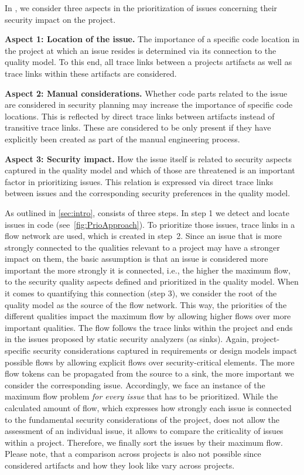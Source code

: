 	    In \appr{}, we consider three aspects in the prioritization of issues concerning their security impact on the project.
	    \begin{description}
	        \item \textbf{Aspect 1: Location of the issue.} The importance of a specific code location in the project at which an issue resides is determined via its connection to the quality model. To this end, all trace links between a projects artifacts as well as trace links within these artifacts are considered.
	        \item \textbf{Aspect 2: Manual considerations.} Whether code parts related to the issue are considered in security planning may increase the importance of specific code locations. This is reflected by direct trace links between artifacts instead of transitive trace links. These are considered to be only present if they have explicitly been created as part of the manual engineering process.
	        \item \textbf{Aspect 3: Security impact.} How the issue itself is related to security aspects captured in the quality model and which of those are threatened is an important factor in prioritizing issues. This relation is expressed via direct trace links between issues and the corresponding security preferences in the quality model.
	    \end{description}

As outlined in \autoref{sec:intro}, \appr{} consists of three steps.
In step 1 we detect and locate issues in code (see~\autoref{fig:PrioApproach}).
To prioritize those issues, trace links in a flow network are used, which is created in step~2.
Since an issue that is more strongly connected to the qualities relevant to a project may have a stronger impact on them, the basic assumption is that an issue is considered more important the more strongly it is connected, i.e., the higher the maximum flow, to the security quality aspects defined and prioritized in the quality model.
When it comes to quantifying this connection (step 3), we consider the root of the quality model as the source of the flow network.
This way, the priorities of the different qualities impact the maximum flow by allowing higher flows over more important qualities.
The flow follows the trace links within the project and ends in the issues proposed by static security analyzers (as sinks).
Again, project-specific security considerations captured in requirements or design models impact possible flows by allowing explicit flows over security-critical elements.
The more flow tokens can be propagated from the source to a sink, the more important we consider the corresponding issue.
Accordingly, we face an instance of the maximum flow problem \emph{for every issue} that has to be prioritized.
While the calculated amount of flow, which expresses how strongly each issue is connected to the fundamental security considerations of the project, does not allow the assessment of an individual issue, it allows to compare the criticality of issues within a project.
Therefore, we finally sort the issues by their maximum flow.
Please note, that a comparison across projects is also not possible since considered artifacts and how they look like vary across projects.

